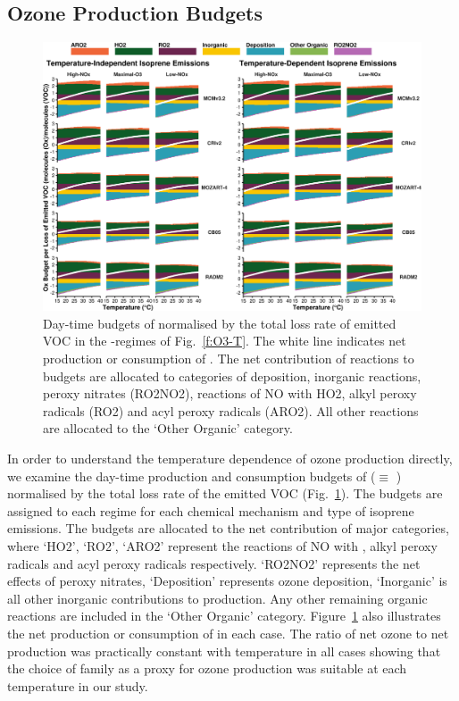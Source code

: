 \subsection{Ozone Production Budgets} \label{ss:r_budgets}
\begin{figure}[t]%
    \centering%
    \caption{Day-time budgets of  normalised by the total loss rate of emitted VOC in the -regimes of Fig.~\ref{f:O3-T}. The white line indicates net production or consumption of . The net contribution of reactions to  budgets are allocated to categories of deposition, inorganic reactions, peroxy nitrates (RO2NO2), reactions of NO with HO2, alkyl peroxy radicals (RO2) and acyl peroxy radicals (ARO2). All other reactions are allocated to the `Other Organic' category.}%
    \label{f:ozone_budgets}%
    \includegraphics[width = \textwidth]{img/Ox_budgets}%
    \vspace{-4mm}
\end{figure}
% 
In order to understand the temperature dependence of ozone production directly, we examine the day-time production and consumption budgets of  ($\equiv$ ) normalised by the total loss rate of the emitted VOC (Fig.~\ref{f:ozone_budgets}).
The  budgets are assigned to each  regime for each chemical mechanism and type of isoprene emissions.
The budgets are allocated to the net contribution of major categories, where `HO2', `RO2', `ARO2' represent the reactions of NO with , alkyl peroxy radicals and acyl peroxy radicals respectively.
`RO2NO2' represents the net effects of peroxy nitrates, `Deposition' represents ozone deposition, `Inorganic' is all other inorganic contributions to  production.
Any other remaining organic reactions are included in the `Other Organic' category.
Figure~\ref{f:ozone_budgets} also illustrates the net production or consumption of  in each case.
The ratio of net ozone to net  production was practically constant with temperature in all cases showing that the choice of  family as a proxy for ozone production was suitable at each temperature in our study.

